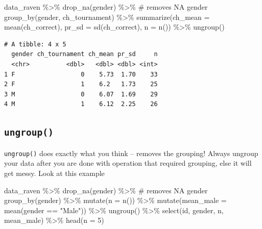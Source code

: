 \documentclass[
  letterpaper,
]{book}
\newenvironment{Shaded}{\begin{snugshade}}{\end{snugshade}}
\newcommand{\AttributeTok}[1]{\textcolor[rgb]{0.40,0.45,0.13}{#1}}
\newcommand{\CommentTok}[1]{\textcolor[rgb]{0.37,0.37,0.37}{#1}}
\newcommand{\DecValTok}[1]{\textcolor[rgb]{0.68,0.00,0.00}{#1}}
\newcommand{\FunctionTok}[1]{\textcolor[rgb]{0.28,0.35,0.67}{#1}}
\newcommand{\NormalTok}[1]{\textcolor[rgb]{0.00,0.23,0.31}{#1}}
\newcommand{\SpecialCharTok}[1]{\textcolor[rgb]{0.37,0.37,0.37}{#1}}
\newcommand{\StringTok}[1]{\textcolor[rgb]{0.13,0.47,0.30}{#1}}
\begin{document}
\begin{Shaded}
\begin{Highlighting}[]
\NormalTok{data\_raven }\SpecialCharTok{\%\textgreater{}\%}
  \FunctionTok{drop\_na}\NormalTok{(gender) }\SpecialCharTok{\%\textgreater{}\%}  \CommentTok{\# removes NA gender}
  \FunctionTok{group\_by}\NormalTok{(gender, ch\_tournament) }\SpecialCharTok{\%\textgreater{}\%} 
  \FunctionTok{summarize}\NormalTok{(}\AttributeTok{ch\_mean =} \FunctionTok{mean}\NormalTok{(ch\_correct),}
            \AttributeTok{pr\_sd =} \FunctionTok{sd}\NormalTok{(ch\_correct),}
            \AttributeTok{n =} \FunctionTok{n}\NormalTok{()) }\SpecialCharTok{\%\textgreater{}\%}
  \FunctionTok{ungroup}\NormalTok{()}
\end{Highlighting}
\end{Shaded}

\begin{verbatim}
# A tibble: 4 x 5
  gender ch_tournament ch_mean pr_sd     n
  <chr>          <dbl>   <dbl> <dbl> <int>
1 F                  0    5.73  1.70    33
2 F                  1    6.2   1.73    25
3 M                  0    6.07  1.69    29
4 M                  1    6.12  2.25    26
\end{verbatim}

\hypertarget{ungroup}{%
\subsection{\texorpdfstring{\texttt{ungroup()}}{ungroup()}}\label{ungroup}}

\texttt{ungroup()} does exactly what you think -- removes the grouping!
Always ungroup your data after you are done with operation that required
grouping, else it will get messy. Look at this example

\begin{Shaded}
\begin{Highlighting}[]
\NormalTok{data\_raven }\SpecialCharTok{\%\textgreater{}\%}
  \FunctionTok{drop\_na}\NormalTok{(gender) }\SpecialCharTok{\%\textgreater{}\%}  \CommentTok{\# removes NA gender}
  \FunctionTok{group\_by}\NormalTok{(gender) }\SpecialCharTok{\%\textgreater{}\%} 
  \FunctionTok{mutate}\NormalTok{(}\AttributeTok{n =} \FunctionTok{n}\NormalTok{()) }\SpecialCharTok{\%\textgreater{}\%}
  \FunctionTok{mutate}\NormalTok{(}\AttributeTok{mean\_male =} \FunctionTok{mean}\NormalTok{(gender }\SpecialCharTok{==} \StringTok{"Male"}\NormalTok{)) }\SpecialCharTok{\%\textgreater{}\%}
  \FunctionTok{ungroup}\NormalTok{() }\SpecialCharTok{\%\textgreater{}\%}
  \FunctionTok{select}\NormalTok{(id, gender, n, mean\_male) }\SpecialCharTok{\%\textgreater{}\%} \FunctionTok{head}\NormalTok{(}\AttributeTok{n =} \DecValTok{5}\NormalTok{)}
\end{Highlighting}
\end{Shaded}
\end{document}
